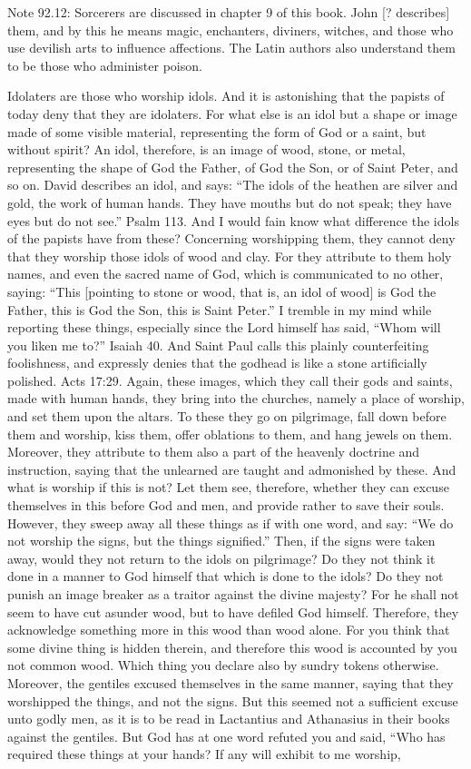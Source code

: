 Note 92.12: Sorcerers are discussed in chapter 9 of this book. John [? describes] them, and by this he means magic, enchanters, diviners, witches, and those who use devilish arts to influence affections. The Latin authors also understand them to be those who administer poison.

Idolaters are those who worship idols. And it is astonishing that the papists of today deny that they are idolaters. For what else is an idol but a shape or image made of some visible material, representing the form of God or a saint, but without spirit? An idol, therefore, is an image of wood, stone, or metal, representing the shape of God the Father, of God the Son, or of Saint Peter, and so on. David describes an idol, and says: “The idols of the heathen are silver and gold, the work of human hands. They have mouths but do not speak; they have eyes but do not see.” Psalm 113. And I would fain know what difference the idols of the papists have from these? Concerning worshipping them, they cannot deny that they worship those idols of wood and clay. For they attribute to them holy names, and even the sacred name of God, which is communicated to no other, saying: “This [pointing to stone or wood, that is, an idol of wood] is God the Father, this is God the Son, this is Saint Peter.” I tremble in my mind while reporting these things, especially since the Lord himself has said, “Whom will you liken me to?” Isaiah 40. And Saint Paul calls this plainly counterfeiting foolishness, and expressly denies that the godhead is like a stone artificially polished. Acts 17:29. Again, these images, which they call their gods and saints, made with human hands, they bring into the churches, namely a place of worship, and set them upon the altars. To these they go on pilgrimage, fall down before them and worship, kiss them, offer oblations to them, and hang jewels on them. Moreover, they attribute to them also a part of the heavenly doctrine and instruction, saying that the unlearned are taught and admonished by these. And what is worship if this is not? Let them see, therefore, whether they can excuse themselves in this before God and men, and provide rather to save their souls. However, they sweep away all these things as if with one word, and say: “We do not worship the signs, but the things signified.” Then, if the signs were taken away, would they not return to the idols on pilgrimage? Do they not think it done in a manner to God himself that which is done to the idols? Do they not punish an image breaker as a traitor against the divine majesty? For he shall not seem to have cut asunder wood, but to have defiled God himself. Therefore, they acknowledge something more in this wood than wood alone. For you think that some divine thing is hidden therein, and therefore this wood is accounted by you not common wood. Which thing you declare also by sundry tokens otherwise. Moreover, the gentiles excused themselves in the same manner, saying that they worshipped the things, and not the signs. But this seemed not a sufficient excuse unto godly men, as it is to be read in Lactantius and Athanasius in their books against the gentiles. But God has at one word refuted you and said, “Who has required these things at your hands? If any will exhibit to me worship, 